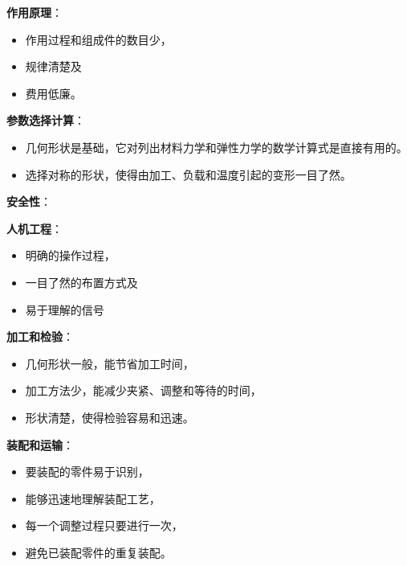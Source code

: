 \documentclass[letterpaper,10pt,english]{sphinxmanual}
\begin{document}
\textbf{作用原理}：
\begin{itemize}
\item {} 
作用过程和组成件的数目少，

\item {} 
规律清楚及

\item {} 
费用低廉。

\end{itemize}

\textbf{参数选择计算}：
\begin{itemize}
\item {} 
几何形状是基础，它对列出材料力学和弹性力学的数学计算式是直接有用的。

\item {} 
选择对称的形状，使得由加工、负载和温度引起的变形一目了然。

\end{itemize}

\textbf{安全性}：

\textbf{人机工程}：
\begin{itemize}
\item {} 
明确的操作过程，

\item {} 
一目了然的布置方式及

\item {} 
易于理解的信号

\end{itemize}

\textbf{加工和检验}：
\begin{itemize}
\item {} 
几何形状一般，能节省加工时间，

\item {} 
加工方法少，能减少夹紧、调整和等待的时间，

\item {} 
形状清楚，使得检验容易和迅速。

\end{itemize}

\textbf{装配和运输}：
\begin{itemize}
\item {} 
要装配的零件易于识别，

\item {} 
能够迅速地理解装配工艺，

\item {} 
每一个调整过程只要进行一次，

\item {} 
避免已装配零件的重复装配。

\end{itemize}
\end{document}
